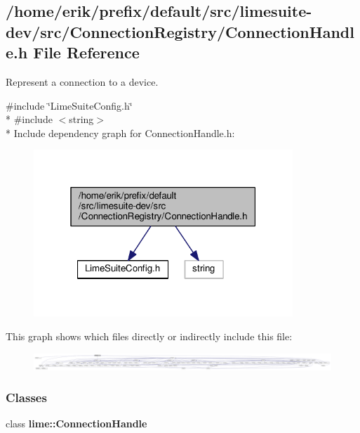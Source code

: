\subsection{/home/erik/prefix/default/src/limesuite-\/dev/src/\+Connection\+Registry/\+Connection\+Handle.h File Reference}
\label{ConnectionHandle_8h}


Represent a connection to a device.  


{\ttfamily \#include \char`\"{}Lime\+Suite\+Config.\+h\char`\"{}}\\*
{\ttfamily \#include $<$string$>$}\\*
Include dependency graph for Connection\+Handle.\+h\+:
\nopagebreak
\begin{figure}[H]
\begin{center}
\leavevmode
\includegraphics[width=277pt]{d5/d0f/ConnectionHandle_8h__incl}
\end{center}
\end{figure}
This graph shows which files directly or indirectly include this file\+:
\nopagebreak
\begin{figure}[H]
\begin{center}
\leavevmode
\includegraphics[width=350pt]{d8/d47/ConnectionHandle_8h__dep__incl}
\end{center}
\end{figure}
\subsubsection*{Classes}
\begin{DoxyCompactItemize}
\item 
class {\bf lime\+::\+Connection\+Handle}
\end{DoxyCompactItemize}
